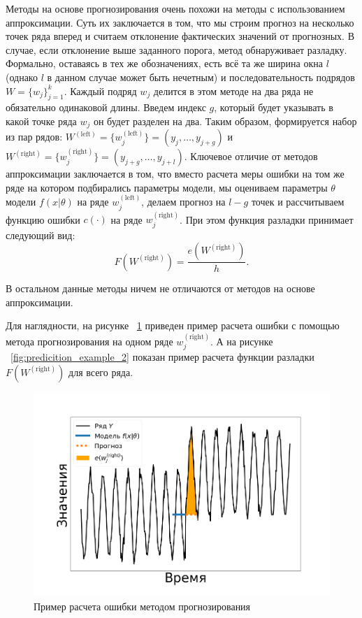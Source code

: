 \documentclass[%
12pt,
master,  %
natbib,      %
subf,        %
substylefile = spbu.rtx,
href,        %
colorlinks,  %
]{disser}
\begin{document}
Методы на основе прогнозирования очень похожи на методы с использованием аппроксимации. Суть их заключается в том, что мы строим прогноз на несколько точек ряда вперед и считаем отклонение фактических значений от прогнозных. В случае, если отклонение выше заданного порога, метод обнаруживает разладку.
Формально, оставаясь в тех же обозначениях, есть всё та же ширина окна $l$ (однако $l$ в данном случае может быть нечетным) и последовательность подрядов $W = \{ w_j \}_{j=1}^k$. Каждый подряд  $w_j$ делится в этом методе на два ряда не обязательно одинаковой длины. Введем индекс $g$, который будет указывать в какой точке ряда $w_j$ он будет разделен на два. Таким образом, формируется набор из пар рядов:  $ W^{\mathrm{(left)}} = \{w_j^{\mathrm{(left)}} \}  =  (y_j, \dots, y_{j+g})$ и $W^{\mathrm{(right)}} = \{w_j^{\mathrm{(right)}} \} = (y_{j+g}, \dots, y_{j+l})$. Ключевое отличие от методов аппроксимации заключается в том, что вместо расчета меры ошибки на том же ряде на котором подбирались параметры модели, мы оцениваем параметры $\theta$ модели $f(x|\theta)$ на ряде $ w_j^{\mathrm{(left)}} $, делаем прогноз на $ l - g $ точек и рассчитываем функцию ошибки $ c(\cdot) $ на ряде $ w_j^{\mathrm{(right)}} $. При этом функция разладки принимает следующий вид:
	\begin{equation*}
	 F(W^{\mathrm{(right)}}) = \frac{e(W^{\mathrm{(right)}})}{h}.
	 \end{equation*}

В остальном данные методы ничем не отличаются от методов на основе аппроксимации.

Для наглядности, на рисунке ~\ref{fig:predicition_example_1} приведен пример расчета ошибки с помощью метода прогнозирования на одном ряде  $ w_j^{\mathrm{(right)}} $. А на рисунке ~\ref{fig:predicition_example_2} показан пример расчета функции разладки $ F(W^{\mathrm{(right)}}) $ для всего ряда.

\begin{figure}[!hhh]
	\begin{center}
		\includegraphics[width=12cm]{approaches_first_4_ru}
	\end{center}
	\vspace{-5mm}\caption{Пример расчета ошибки методом прогнозирования}
	\label{fig:predicition_example_1}
\end{figure}
\end{document}
